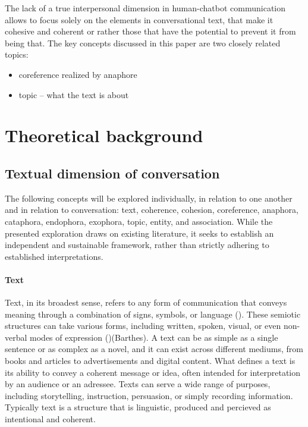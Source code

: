 \documentclass[12pt]{report}
\begin{document}
{\par
The lack of a true interpersonal dimension in human-chatbot communication
allows to focus solely on the elements in conversational text,
that make it cohesive and coherent or rather
those that have the potential to prevent it from being that.
The key concepts discussed in this paper are
two closely related topics:

\begin{itemize}
\item
coreference realized by anaphore

\item
topic – what the text is about
\end{itemize}
\pagebreak

\chapter{Theoretical background}


\section{Textual dimension of conversation}
\par
    The following concepts will be explored individually, in relation to one another and in relation to conversation: text, coherence, cohesion, coreference, anaphora, cataphora, endophora, exophora, topic, entity, and association. While the presented exploration draws on existing literature, it seeks to establish an independent and sustainable framework, rather than strictly adhering to established interpretations.

\subsubsection{Text}
\par
    Text, in its broadest sense, refers to any form of communication that conveys meaning through a combination of signs, symbols, or language ().
    These semiotic structures can take various forms, including written, spoken, visual, or even non-verbal modes of expression ()(Barthes).
    A text can be as simple as a single sentence or as complex as a novel, and it can exist across different mediums, from books and articles to advertisements and digital content.
    What defines a text is its ability to convey a coherent message or idea, often intended for interpretation by an audience or an adressee.
    Texts can serve a wide range of purposes, including storytelling, instruction, persuasion, or simply recording information.
    Typically text is a structure that is
    linguistic, produced and percieved as intentional and coherent.

}
\end{document}
